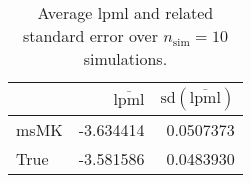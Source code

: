 \begin{table}[H]

\caption{Average lpml and related standard error over $n_{\text{sim}} = 10$ simulations.}
\centering
\begin{tabular}[t]{lrr}
\toprule
  & $\overbar{\text{lpml}}$ & $\text{sd}(\overbar{\text{lpml}})$\\
\midrule
msMK & -3.634414 & 0.0507373\\
True & -3.581586 & 0.0483930\\
\bottomrule
\end{tabular}
\end{table}